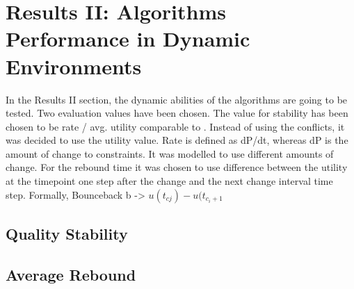 %

\section{Results II: Algorithms Performance in Dynamic Environments}

In the Results II section, the dynamic abilities of the algorithms are going to be tested. Two evaluation values have been chosen. The value for stability has been chosen to be rate / avg. utility comparable to  \cite{Mailler2014}. Instead of using the conflicts, it was decided to use the utility value. Rate is defined as dP/dt, whereas dP is the amount of change to constraints. It was modelled to use different amounts of change. For the rebound time it was chosen to use difference between the utility at the timepoint one step after the change and the next change interval time step. Formally, Bounceback b -> \(u(t_{cj})-u(t_{c_i+1}\)

\subsection{Quality Stability}







\subsection{Average Rebound}



